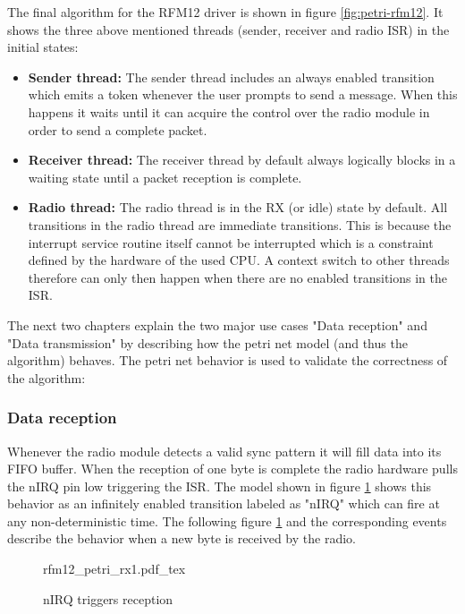 The final algorithm for the RFM12 driver is shown in figure \ref{fig:petri-rfm12}. It shows the three above mentioned threads (sender, receiver and radio ISR) in the initial states:

\begin{itemize}
    \item \textbf{Sender thread:} The sender thread includes an always enabled transition which emits a token whenever the user prompts to send a message. When this happens it waits until it can acquire the control over the radio module in order to send a complete packet.
    \item \textbf{Receiver thread:} The receiver thread by default always logically blocks in a waiting state until a packet reception is complete.
    \item \textbf{Radio thread:} The radio thread is in the RX (or idle) state by default. All transitions in the radio thread are immediate transitions. This is because the interrupt service routine itself cannot be interrupted which is a constraint defined by the hardware of the used CPU. A context switch to other threads therefore can only then happen when there are no enabled transitions in the ISR.
\end{itemize}

The next two chapters explain the two major use cases "Data reception" and "Data transmission" by describing how the petri net model (and thus the algorithm) behaves. The petri net behavior is used to validate the correctness of the algorithm:

\subsubsection{Data reception} %
Whenever the radio module detects a valid sync pattern it will fill data into its FIFO buffer. When the reception of one byte is complete the radio hardware pulls the nIRQ pin low triggering the ISR. The model shown in figure \ref{fig:petri-rx1} shows this behavior as an infinitely enabled transition labeled as "nIRQ" which can fire at any non-deterministic time. The following figure \ref{fig:petri-rx1} and the corresponding events describe the behavior when a new byte is received by the radio.

\begin{figure}[H]
\centering
{rfm12_petri_rx1.pdf_tex}
\caption{nIRQ triggers reception}
\label{fig:petri-rx1}
\end{figure}

